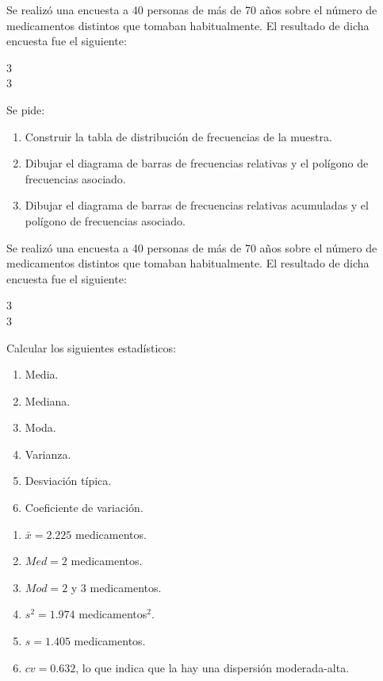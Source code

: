 
{Se realizó una encuesta a 40 personas de más de 70 años sobre el número de medicamentos distintos que tomaban habitualmente. El resultado de dicha encuesta fue el siguiente:
\begin{center}
3 \\
3
\end{center}
Se pide:
\begin{enumerate}
\item Construir la tabla de distribución de frecuencias de la muestra.
\item Dibujar el diagrama de barras de frecuencias relativas y el polígono de frecuencias asociado.
\item Dibujar el diagrama de barras de frecuencias relativas acumuladas y el polígono de frecuencias asociado.
\end{enumerate}
}
{
}
{}

{Se realizó una encuesta a 40 personas de más de 70 años sobre el número de medicamentos distintos que tomaban habitualmente. El resultado de dicha encuesta fue el siguiente:
\begin{center}
3 \\
3
\end{center}
Calcular los siguientes estadísticos:
\begin{enumerate}
\item Media.
\item Mediana.
\item Moda.
\item Varianza. 
\item Desviación típica.
\item Coeficiente de variación.
\end{enumerate}
}
{\begin{enumerate}
\item $ \bar{x} = 2.225$ medicamentos.
\item $Med =2$ medicamentos.
\item $Mod= 2$ y $3$ medicamentos.
\item $s^2 = 1.974$ medicamentos$^2$.
\item $s= 1.405$ medicamentos.
\item $cv = 0.632$, lo que indica que la hay una dispersión moderada-alta.
\end{enumerate}
}
{}


